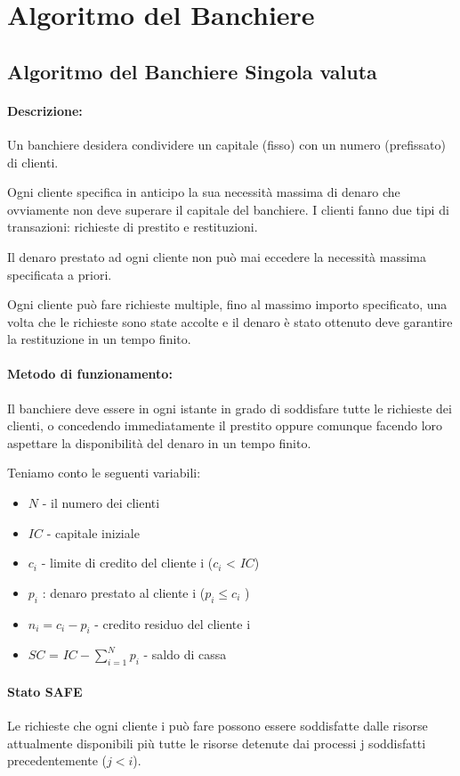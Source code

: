 \section{Algoritmo del Banchiere}
\subsection{Algoritmo del Banchiere Singola valuta}
\paragraph{Descrizione:} 
Un banchiere desidera condividere un capitale (fisso) con un numero
(prefissato) di clienti.

Ogni cliente specifica in anticipo la sua necessità massima di denaro che ovviamente non deve superare il capitale del banchiere.
I clienti fanno due tipi di transazioni: richieste di prestito
e restituzioni.

Il denaro prestato ad ogni cliente non può mai eccedere la necessità massima specificata a priori.

Ogni cliente può fare richieste multiple, fino al massimo importo specificato, una volta che le richieste sono state accolte e il denaro è stato ottenuto deve garantire la restituzione in un tempo finito.

\paragraph{Metodo di funzionamento:} Il banchiere deve essere in ogni istante in grado di soddisfare tutte le richieste dei clienti, o concedendo immediatamente il prestito oppure comunque facendo loro aspettare la disponibilità del denaro in un tempo
finito.

Teniamo conto le seguenti variabili:
\begin{itemize}
    \item $N$ - il numero dei clienti
    \item $IC$ - capitale iniziale
    \item $c_i$ - limite di credito del cliente i ($c_i$ < $IC$)
    \item $p_i$ : denaro prestato al cliente i ($p_i \le c_i$ )
    \item $n_i = c_i - p_i$  - credito residuo del cliente i
    \item $SC$ = $IC - \sum_{i=1}^{N}p_i$ -  saldo di cassa 
\end{itemize}

\paragraph{Stato SAFE}
Le richieste che ogni cliente i può fare possono essere soddisfatte dalle risorse attualmente disponibili più tutte le risorse detenute dai processi j soddisfatti precedentemente ($j < i$).
